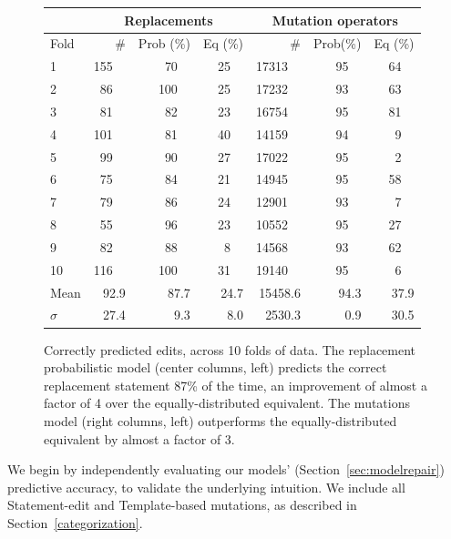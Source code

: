 \documentclass[conference]{IEEEtran}
\begin{document}
\begin{figure}[ht]
{\footnotesize
{\centering
\begin{tabular}{l|rrr|rrr}
\toprule
   &\multicolumn{3}{c|}{Replacements} &\multicolumn{3}{c}{Mutation operators} \\
\midrule
Fold	& \# &Prob (\%)& Eq (\%)& \# &Prob(\%)& Eq (\%) \\
\midrule
1	& 155~~&70~~&25~~& 17313~~& 95~~& 64~~   \\
2	& 86~~&100~~&25~~& 17232~~& 93~~& 63~~   \\
3	& 81~~&82~~&23~~& 16754~~& 95~~& 81~~ \\
4	& 101~~&81~~&40~~& 14159~~& 94~~& 9~~   \\
5	& 99~~&90~~&27~~& 17022~~& 95~~& 2~~  \\
6	& 75~~&84~~&21~~& 14945~~& 95~~& 58~~  \\
7	& 79~~&86~~&24~~& 12901~~& 93~~& 7~~  \\
8	& 55~~&96~~&23~~& 10552~~& 95~~& 27~~  \\
9	& 82~~&88~~&8~~& 14568~~& 93~~& 62~~ \\
10	& 116~~&100~~&31~~& 19140~~& 95~~& 6~~ \\
\midrule
Mean	& 92.9 &87.7	&24.7& 15458.6  & 94.3 & 37.9  \\
\midrule
$\sigma$ & 27.4&9.3&	8.0 & 2530.3 & 0.9 & 30.5   \\
\bottomrule
\end{tabular}
\center
  \caption{Correctly predicted edits, across 10 folds of data.
The replacement probabilistic model (center columns, left) predicts
    the correct replacement statement 87\% of the time,
    an improvement of almost a factor of 4 over the equally-distributed equivalent. 
    The mutations model (right columns, left) outperforms the equally-distributed equivalent by 
    almost a factor of 3. \label{results10fcv}} 
}}
\end{figure} 

We begin by independently evaluating our models' (Section~\ref{sec:modelrepair}) predictive accuracy, to
validate the underlying intuition.  We include all Statement-edit and Template-based
mutations, as described in Section~\ref{categorization}.
\end{document}
